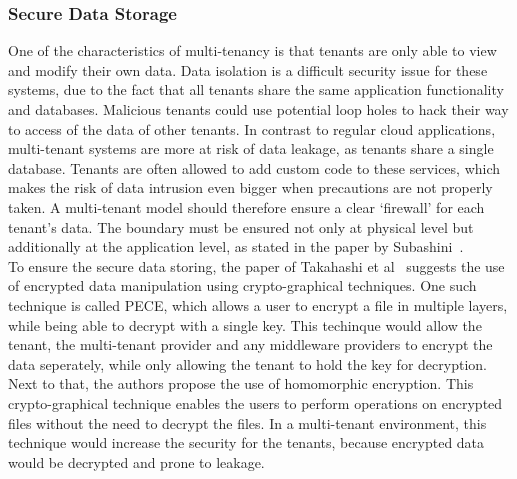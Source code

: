 \subsubsection{Secure Data Storage}
One of the characteristics of multi-tenancy is that tenants are only able to view and modify their own data.
Data isolation is a difficult security issue for these systems, due to the fact that all tenants share the same application functionality and databases. 
Malicious tenants could use potential loop holes to hack their way to access of the data of other tenants. 
In contrast to regular cloud applications, multi-tenant systems are more at risk of data leakage, as tenants share a single database.
Tenants are often allowed to add custom code to these services, which makes the risk of data intrusion even bigger when precautions are not properly taken. 
A multi-tenant model should therefore ensure a clear ‘firewall’ for each tenant’s data.
The boundary must be ensured not only at physical level but additionally at the application level, as stated in the paper by Subashini~\cite{Subashini2011Security}.\\

To ensure the secure data storing, the paper of Takahashi et al~\cite{Takahashi2012Security} suggests the use of encrypted data manipulation using crypto-graphical techniques. 
One such technique is called \acf{PECE}, which allows a user to encrypt a file in multiple layers, while being able to decrypt with a single key.
This techinque would allow the tenant, the multi-tenant provider and any middleware providers to encrypt the data seperately, while only allowing the tenant to hold the key for decryption.
Next to that, the authors propose the use of homomorphic encryption. 
This crypto-graphical technique enables the users to perform operations on encrypted files without the need to decrypt the files.
In a multi-tenant environment, this technique would increase the security for the tenants, because encrypted data would be decrypted and prone to leakage.

